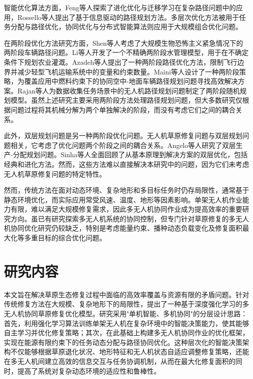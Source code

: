 \documentclass[AutoFakeBold]{LZUThesis}
\begin{document}
智能优化算法方面，Feng等人探索了进化优化与迁移学习在复杂路径问题中的应用\cite{feng2015memes}，Rossello等人提出了基于信息驱动的路径规划方法\cite{rossello2021information}。多层次优化方法被用于任务分配与路径优化\cite{colson2007overview}，协同优化与分布式智能算法则应用于大规模组合优化问题\cite{huang2004cooperative}。

在两阶段优化方法研究方面，Shen等人\cite{shen2009two}考虑了大规模生物恐怖主义紧急情况下的两阶段车辆路径问题。Li等人\cite{li2010inexact}开发了一个不精确两阶段水管理模型，用于在不确定条件下规划农业灌溉。Azadeh等人\cite{azadeh2019two}提出了一种两阶段路径优化方法，限制飞行边界并减少轻型飞机运输系统中的变量和约束数量。Maini等人\cite{maini2019cooperative}设计了一种两阶段策略，为覆盖应用中燃料约束下的协同空中-地面车辆路径规划问题寻找高效解决方案。Rajan等人\cite{rajan2022routing}为数据收集任务场景中的无人机路径规划问题制定了两阶段随机规划模型。虽然上述研究主要采用两阶段方法处理路径规划问题，但大多数研究仅根据问题过程将其机械分解为两个单独解决的阶段，而没有考虑它们之间的耦合关系。

此外，双层规划问题\cite{colson2007overview}是另一种两阶段优化问题。无人机草原修复问题与双层规划问题相关，它考虑了优化问题两个阶段之间的耦合关系。Angelo等人\cite{angelo2015study}研究了双层生产-分配规划问题。Sinha等人\cite{sinha2017review}全面回顾了从基本原理到解决方案的双层优化，包括经典和进化方法。然而，这些方法难以直接解决本研究中的问题，因为它们未考虑无人机草原修复问题的特定特性。

然而，传统方法在面对动态环境、复杂地形和多目标任务时仍存局限性\cite{gann2019international}，通常基于静态环境优化，而实际应用常受风速、温度、地形等因素影响\cite{blackburn2021monitoring}。单架无人机作业能力有限，难以满足大规模修复需求，因此多无人机协同作业成为提高效率的重要研究方向\cite{dorling2016vehicle,maini2019cooperative}。虽已有研究探索多无人机系统的协同控制\cite{buters2019seed}，但专门针对草原修复的多无人机协同优化研究仍较缺乏，特别是考虑能量约束、播种动态负载变化及修复面积最大化等多重目标的综合优化问题。

\section{研究内容}
本文旨在解决草原生态修复过程中面临的高效率覆盖与资源有限的矛盾问题。针对传统修复方法在大规模、复杂地形下的局限性，提出了一种基于深度强化学习的多无人机协同草原修复优化模型。研究采用"单机智能、多机协同"的分层设计思路：首先，利用强化学习算法训练单架无人机在复杂环境中的智能决策能力，使其能够自主学习并优化修复策略；其次，在此基础上构建多无人机协同作业的优化框架，实现在能源有限约束下的任务动态分配与路径协同优化。这种层次化的智能决策架构不仅能够根据草原退化状况、地形特征和无人机状态自适应调整修复策略，还能在多无人机间建立高效的信息交互与任务协调机制，从而在最大化修复面积的同时，提高了系统对复杂动态环境的适应性和鲁棒性。
\end{document}
